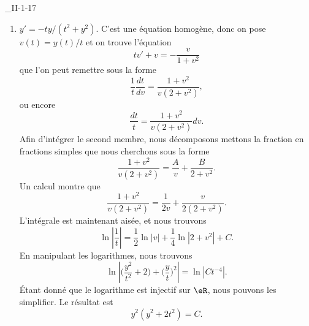 \begin{corrige}{_II-1-17}
\begin{enumerate}
\item
$y'=-ty/(t^2+y^2)$. C'est une équation homogène, donc on pose $v(t)=y(t)/t$ et on trouve l'équation
\begin{equation}
	tv'+v=-\frac{ v }{ 1+v^2 }
\end{equation}
que l'on peut remettre sous la forme
\begin{equation}
	\frac{1}{ t }\frac{ dt }{ dv }=\frac{ 1+v^2 }{ v(2+v^2) },
\end{equation}
ou encore
\begin{equation}
	\frac{ dt }{ t }=\frac{ 1+v^2 }{ v(2+v^2) }dv.
\end{equation}
Afin d'intégrer le second membre, nous décomposons mettons la fraction en fractions simples que nous cherchons sous la forme
\begin{equation}
	\frac{ 1+v^2 }{ v(2+v^2) }=\frac{ A }{ v }+\frac{ B }{ 2+v^2 }.
\end{equation}
Un calcul montre que
\begin{equation}
	\frac{ 1+v^2 }{ v(2+v^2) }=\frac{ 1 }{ 2v }+\frac{ v }{ 2(2+v^2) }.
\end{equation}
L'intégrale est maintenant aisée, et nous trouvons
\begin{equation}
	\ln\left| \frac{ 1 }{ t } \right| =\frac{ 1 }{2}\ln| v |+\frac{1}{ 4 }\ln| 2+v^2 |+C.
\end{equation}
En manipulant les logarithmes, nous trouvons
\begin{equation}
	\ln\left| \big( \frac{ y^2 }{ t^2 }+2\big)+\big( \frac{ y }{ t } \big)^2  \right|=\ln| Ct^{-4} |.
\end{equation}
Étant donné que le logarithme est injectif sur $\eR$, nous pouvons les simplifier. Le résultat est
\begin{equation}
	y^2(y^2+2t^2)=C.
\end{equation}

\end{enumerate}

\end{corrige}
